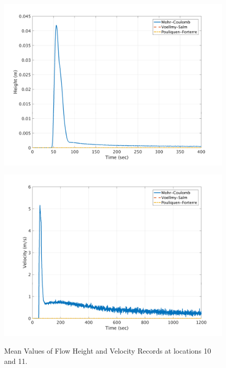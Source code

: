 \documentclass[a4paper,10pt]{article}
\begin{document}
\begin{figure}[H]
	\begin{minipage}[b]{0.5\linewidth}
	\centering
    \includegraphics[width=1\textwidth]{HeightMeans/H11All.png}     
        \label{fig:MFHR_L11}
	\end{minipage}
	\begin{minipage}[b]{0.5\linewidth}
	\centering
    \includegraphics[width=1\textwidth]{VelocityMeans/V11All.png}
        \label{fig:MFVR_L11}
	\end{minipage}
	
	\caption{Mean Values of Flow Height and Velocity Records at locations 10 and 11.}\label{fig:MFHVR_L1011}	
\end{figure}
\end{document}
